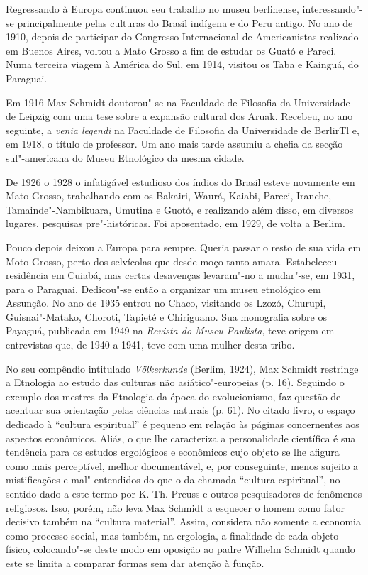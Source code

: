 Regressando à Europa continuou seu trabalho no museu berlinense,
interessando"-se principalmente pelas culturas do Brasil indígena e do
Peru antigo. No ano de 1910, depois de participar do Congresso
Internacional de Americanistas realizado em Buenos Aires, voltou a Mato
Grosso a fim de estudar os Guató e Pareci. Numa terceira viagem à
América do Sul, em 1914, visitou os Taba e Kainguá, do Paraguai.

Em 1916 Max Schmidt doutorou"-se na Faculdade de Filosofia da
Universidade de Leipzig com uma tese sobre a expansão cultural dos
Aruak. Recebeu, no ano seguinte, a \emph{venia legendi} na Faculdade de
Filosofia da Universidade de BerlirTl e, em 1918, o título de professor.
Um ano mais tarde assumiu a chefia da secção sul"-americana do Museu
Etnológico da mesma cidade.

De 1926 o 1928 o infatigável estudioso dos índios do Brasil esteve
novamente em Mato Grosso, trabalhando com os Bakairi, Waurá, Kaiabi,
Pareci, Iranche, Tamainde"-Nambikuara, Umutina e Guotó, e realizando além
disso, em diversos lugares, pesquisas pre"-históricas. Foi aposentado, em
1929, de volta a Berlim.

Pouco depois deixou a Europa para sempre. Queria passar o resto de sua
vida em Moto Grosso, perto dos selvícolas que desde moço tanto amara.
Estabeleceu residência em Cuiabá, mas certas desavenças levaram"-no a
mudar"-se, em 1931, para o Paraguai. Dedicou"-se então a organizar um
museu etnológico em Assunção. No ano de 1935 entrou no Chaco, visitando
os Lzozó, Churupi, Guisnai"-Matako, Choroti, Tapieté e Chiriguano. Sua
monografia sobre os Payaguá, publicada em 1949 na \emph{Revista do Museu
Paulista}, teve origem em entrevistas que, de 1940 a 1941, teve com uma
mulher desta tribo.


No seu compêndio intitulado \emph{Völkerkunde} (Berlim, 1924), Max
Schmidt restringe a Etnologia ao estudo das culturas não
asiático"-europeias (p. 16). Seguindo o exemplo dos mestres da Etnologia
da época do evolucionismo, faz questão de acentuar sua orientação pelas
ciências naturais (p. 61). No citado livro, o espaço dedicado à
``cultura espiritual'' é pequeno em relação às páginas concernentes aos
aspectos econômicos. Aliás, o que lhe caracteriza a personalidade
científica é sua tendência para os estudos ergológicos e econômicos cujo
objeto se lhe afigura como mais perceptível, melhor documentável, e, por
conseguinte, menos sujeito a mistificações e mal"-entendidos do que o da
chamada ``cultura espiritual'', no sentido dado a este termo por K. Th.
Preuss e outros pesquisadores de fenômenos religiosos. Isso, porém, não
leva Max Schmidt a esquecer o homem como fator decisivo também na
``cultura material''. Assim, considera não somente a economia como
processo social, mas também, na ergologia, a finalidade de cada objeto
físico, colocando"-se deste modo em oposição ao padre Wilhelm Schmidt
quando este se limita a comparar formas sem dar atenção à função.

